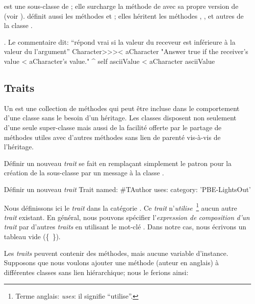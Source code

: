 \documentclass[a4paper,10pt,twoside]{book}
\begin{document}
 est une sous-classe de ; elle surcharge la méthode  de \ct{<} avec sa propre version de \ct{<} (voir ).   définit aussi les méthodes \ct{=} et ; elles héritent les méthodes \ct{>=}, \ct{<=}, \ct{~=} et autres de la classe .

\begin{method}[CharacterLessThan]{. Le commentaire dit: ``répond vrai si la valeur du receveur est inférieure à la valeur du l'argument''}
Character>>>< aCharacter 
	"Answer true if the receiver's value < aCharacter's value."
	^ self asciiValue < aCharacter asciiValue
\end{method}

\subsection{Traits}
Un  est une collection de méthodes qui peut être incluse dans le comportement d'une classe sans le besoin d'un héritage.
Les classes disposent non seulement d'une seule super-classe mais aussi de la facilité offerte par le partage de méthodes utiles avec d'autres méthodes sans lien de parenté vis-à-vis de l'héritage.

Définir un nouveau \emph{trait} se fait en remplaçant simplement le patron
pour la création de la sous-classe par un message à la classe .

\begin{classdef}[tauthor]{Définir un nouveau \emph{trait}}
Trait named: #TAuthor
	uses: { }
	category: 'PBE-LightsOut'
\end{classdef}

\noindent
Nous définissons ici le \emph{trait}  dans la catégorie .
Ce \emph{trait} n'\emph{utilise}~\footnote{Terme anglais: \emph{uses}: il signifie ``utilise''.} aucun autre \emph{trait} existant.
En général, nous pouvons spécifier l'\emph{expression de composition d'un trait} par d'autres \emph{traits} en u\-ti\-li\-sant le mot-clé .
Dans notre cas, nous écrivons un tableau vide \mbox{(\{ \}).}

Les \emph{traits} peuvent contenir des méthodes, mais aucune variable d'instance.
Supposons que nous voulons ajouter une méthode  (auteur en anglais) à différentes classes sans lien hiérarchique;
nous le ferions ainsi:
\end{document}
